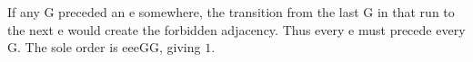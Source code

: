 If any G preceded an e somewhere, the transition from the last G in that run to the next e would create the forbidden adjacency. Thus every e must precede every G. The sole order is eeeGG, giving $\boxed1$.
